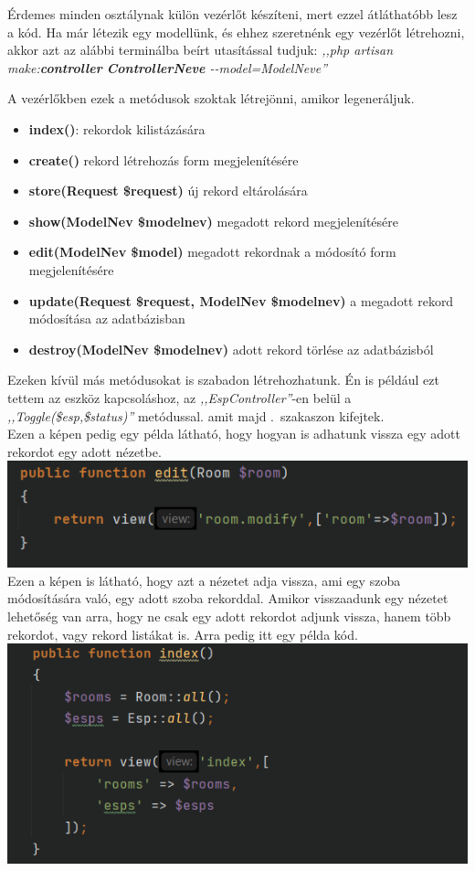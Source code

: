 \documentclass[
]{thesis-ekf}
\theoremstyle{definition}
\theoremstyle{remark}
\begin{document}
	Érdemes minden osztálynak külön vezérlőt készíteni, mert ezzel átláthatóbb lesz a kód. Ha már létezik egy modellünk, és ehhez szeretnénk egy vezérlőt létrehozni, akkor azt az alábbi terminálba beírt utasítással tudjuk: \emph{,,php artisan make:\textbf{controller} \textbf{ControllerNeve} \--\--model=ModelNeve''}\cite{laravel-controller}
	
	A vezérlőkben ezek a metódusok szoktak létrejönni, amikor legeneráljuk.
	\begin{itemize}
		\item \textbf{index()}: rekordok kilistázására 
		\item \textbf{create()} rekord létrehozás form megjelenítésére 
		\item \textbf{store(Request \$request)} új rekord eltárolására 
		\item \textbf{show(ModelNev \$modelnev)} megadott rekord megjelenítésére 
		\item \textbf{edit(ModelNev \$model)} megadott rekordnak a módosító form megjelenítésére
		\item \textbf{update(Request \$request, ModelNev \$modelnev)} a megadott rekord módosítása az adatbázisban
		\item \textbf{destroy(ModelNev \$modelnev)} adott rekord törlése az adatbázisból
	\end{itemize}
	Ezeken kívül más metódusokat is szabadon létrehozhatunk. Én is például ezt tettem az eszköz kapcsoláshoz, az \emph{,,EspController''}-en belül a \emph{,,Toggle(\$esp,\$status)''} metódussal. amit majd .~szakaszon kifejtek.
	\\
	Ezen a képen pedig egy példa látható, hogy hogyan is adhatunk vissza egy adott rekordot egy adott nézetbe.
	\\
	\label{return-room}\includegraphics[width=1\textwidth]{./src/codes/return_view}
	\\
	Ezen a képen is látható, hogy azt a nézetet adja vissza, ami egy szoba módosítására való, egy adott szoba rekorddal. Amikor visszaadunk egy nézetet lehetőség van arra, hogy ne csak egy adott rekordot adjunk vissza, hanem több rekordot, vagy rekord listákat is. Arra pedig itt egy példa kód.
	\\
	\includegraphics[width=1\textwidth]{./src/codes/return_lists}
	
\end{document}
